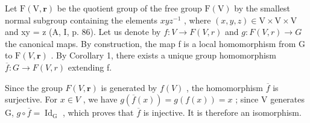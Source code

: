 Let \(\mathrm{F}(\mathrm{V}, \mathbf{r})\) be the quotient group of the free group \(\mathrm{F}(\mathrm{V})\) by the smallest normal subgroup containing the elements \(xyz^{-1}\) , where \((x, y, z) \in \mathrm{V} \times \mathrm{V} \times \mathrm{V}\) and xy = z (A, I, p. 86). Let us denote by \(f: V \to F(V, r)\) and \(g: F(V, r) \to G\) the canonical maps. By construction, the map f is a local homomorphism from G to \(\mathrm{F}(V, \mathbf{r})\) . By Corollary 1, there exists a unique group homomorphism \(\overline{f}: G \to F(V, r)\) extending f.

Since the group \(F(V, \mathbf{r})\) is generated by \(f(V)\) , the homomorphism \(\overline{f}\) is surjective. For \(x \in V\) , we have \(g(\overline{f}(x)) = g(f(x)) = x\) ; since V generates G, \(g \circ \overline{f} = \operatorname{Id}_{\operatorname{G}}\) , which proves that \(\overline{f}\) is injective. It is therefore an isomorphism.
\relax{}
